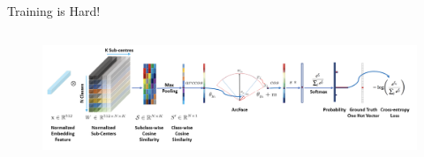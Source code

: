 \documentclass{zkdl-presentation-template}
\begin{document}
    \begin{frame}{Training is Hard!}
        \begin{columns}
            \begin{column}{0.65\textwidth}
                \begin{figure}
                    \centering
                    \includegraphics[width=\textwidth]{images/loss_1.png}
                \end{figure}
            \end{column}
        

\end{columns}
\end{frame}
\end{document}
